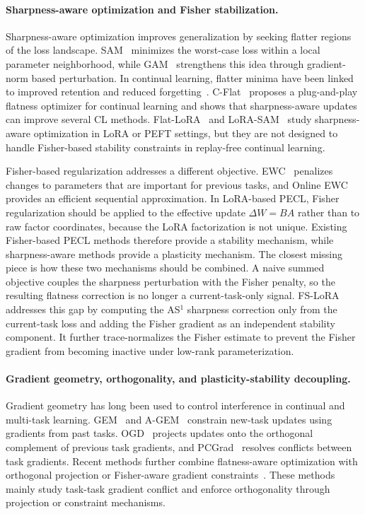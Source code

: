 \paragraph{Sharpness-aware optimization and Fisher stabilization.}
Sharpness-aware optimization improves generalization by seeking flatter regions of the loss landscape.
SAM~\citep{foretSharpnessAwareMinimizationEfficiently2021} minimizes the worst-case loss within a local parameter neighborhood, while GAM~\citep{zhengGradientAwareminimizationDistributed2021} strengthens this idea through gradient-norm based perturbation.
In continual learning, flatter minima have been linked to improved retention and reduced forgetting~\citep{NEURIPS2020_518a38cc,shiOvercomingCatastrophicForgetting2021}.
C-Flat~\citep{NEURIPS2024_C-Flat} proposes a plug-and-play flatness optimizer for continual learning and shows that sharpness-aware updates can improve several CL methods.
Flat-LoRA~\citep{li2024flatlora} and LoRA-SAM~\citep{NEURIPS2024_4eb2c0ad} study sharpness-aware optimization in LoRA or PEFT settings, but they are not designed to handle Fisher-based stability constraints in replay-free continual learning.

Fisher-based regularization addresses a different objective.
EWC~\citep{EWC2017} penalizes changes to parameters that are important for previous tasks, and Online EWC~\citep{schwarz2018progress} provides an efficient sequential approximation.
In LoRA-based PECL, Fisher regularization should be applied to the effective update $\Delta W=BA$ rather than to raw factor coordinates, because the LoRA factorization is not unique.
Existing Fisher-based PECL methods therefore provide a stability mechanism, while sharpness-aware methods provide a plasticity mechanism.
The closest missing piece is how these two mechanisms should be combined.
A naive summed objective couples the sharpness perturbation with the Fisher penalty, so the resulting flatness correction is no longer a current-task-only signal.
FS-LoRA addresses this gap by computing the AS$^1$ sharpness correction only from the current-task loss and adding the Fisher gradient as an independent stability component.
It further trace-normalizes the Fisher estimate to prevent the Fisher gradient from becoming inactive under low-rank parameterization.

\paragraph{Gradient geometry, orthogonality, and plasticity-stability decoupling.}
Gradient geometry has long been used to control interference in continual and multi-task learning.
GEM~\citep{Lopez-Paz2017GEM} and A-GEM~\citep{chaudhry2019gem} constrain new-task updates using gradients from past tasks.
OGD~\citep{farajtabar2020orthogonal} projects updates onto the orthogonal complement of previous task gradients, and PCGrad~\citep{yu2020gradient} resolves conflicts between task gradients.
Recent methods further combine flatness-aware optimization with orthogonal projection or Fisher-aware gradient constraints~\citep{yangRevisitingFlatnessAwareOptimization2025,garg2026fopng}.
These methods mainly study task-task gradient conflict and enforce orthogonality through projection or constraint mechanisms.

